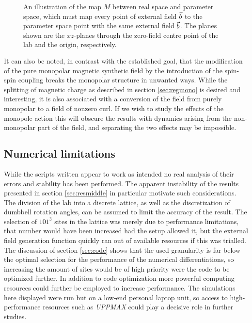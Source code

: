 \documentclass[main.tex]{subfiles}
\begin{document}
\begin{figure}[h]
        \centering
        \caption{\centering An illustration of the map \(M\) between real space and parameter space,
        which must map every point of external field \(\vec{b}\) to the parameter space
point with the same external field \(\vec{b}\). The planes shown are the \(xz\)-planes
through the zero-field centre point of the lab and the origin, respectively.}
        \label{fig:fieldcompare}
\end{figure}

It can also be noted, in contrast with the established goal, that the modification of the
pure monopolar magnetic synthetic field by the introduction of the spin-spin coupling
breaks the monopolar structure in unwanted ways. While the splitting of magnetic charge as
described in section \ref{sec:regmono} is desired and interesting, it is also associated
with a conversion of the field from purely monopolar to a field of nonzero curl. If we wish
to study the effects of the monopole action this will obscure the results with dynamics
arising from the non-monopolar part of the field, and separating the two effects may be
impossible.

\subsection{Numerical limitations}
While the scripts written appear to work as intended no real analysis of their errors and
stability has been performed. The apparent instability of the results presented in section
\ref{sec:resmiddle} in particular motivate such considerations. The division of the lab into a discrete lattice, as well as
the discretization of dumbbell rotation angles, can be assumed to limit the accuracy of the
result. The selection of \(101^3\) sites in the lattice was merely due to performance
limitations, that number would have been increased had the setup allowed it, but the external
field generation function quickly ran out of available resources if this was trialled. The
discussion of section \ref{sec:code} shows that the used granularity is far below the
optimal selection for the performance of the numerical differentiations, so increasing the
amount of sites would be of high priority were the code to be optimized further. In
addition to code optimization more powerful computing resources could
further be employed to increase performance. The simulations here displayed were run but on
a low-end personal laptop unit, so access to high-performance resources such as \textit{UPPMAX} \cite{UPPMAX} could play a
decisive role in further studies.
\end{document}
